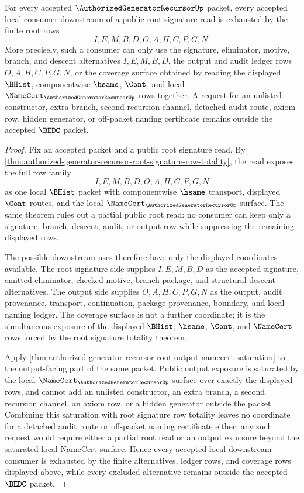 \begin{theorem}
\label{thm:authorized-generator-recursor-root-signature-downstream-coverage}
For every accepted $\AuthorizedGeneratorRecursorUp$ packet, every accepted local consumer downstream of a public root signature read is exhausted by the finite root rows
$$
I,E,M,B,D,O,A,H,C,P,G,N.
$$
More precisely, such a consumer can only use the signature, eliminator, motive, branch, and descent alternatives $I,E,M,B,D$, the output and audit ledger rows $O,A,H,C,P,G,N$, or the coverage surface obtained by reading the displayed $\BHist$, componentwise $\hsame$, $\Cont$, and local $\NameCert_{\AuthorizedGeneratorRecursorUp}$ rows together. A request for an unlisted constructor, extra branch, second recursion channel, detached audit route, axiom row, hidden generator, or off-packet naming certificate remains outside the accepted $\BEDC$ packet.
\end{theorem}
\begin{proof}
Fix an accepted packet and a public root signature read. By \autoref{thm:authorized-generator-recursor-root-signature-row-totality}, the read exposes the full row family
$$
I,E,M,B,D,O,A,H,C,P,G,N
$$
as one local $\BHist$ packet with componentwise $\hsame$ transport, displayed $\Cont$ routes, and the local $\NameCert_{\AuthorizedGeneratorRecursorUp}$ surface. The same theorem rules out a partial public root read: no consumer can keep only a signature, branch, descent, audit, or output row while suppressing the remaining displayed rows.

The possible downstream uses therefore have only the displayed coordinates available. The root signature side supplies $I,E,M,B,D$ as the accepted signature, emitted eliminator, checked motive, branch package, and structural-descent alternatives. The output side supplies $O,A,H,C,P,G,N$ as the output, audit provenance, transport, continuation, package provenance, boundary, and local naming ledger. The coverage surface is not a further coordinate; it is the simultaneous exposure of the displayed $\BHist$, $\hsame$, $\Cont$, and $\NameCert$ rows forced by the root signature totality theorem.

Apply \autoref{thm:authorized-generator-recursor-root-output-namecert-saturation} to the output-facing part of the same packet. Public output exposure is saturated by the local $\NameCert_{\AuthorizedGeneratorRecursorUp}$ surface over exactly the displayed rows, and cannot add an unlisted constructor, an extra branch, a second recursion channel, an axiom row, or a hidden generator outside the packet. Combining this saturation with root signature row totality leaves no coordinate for a detached audit route or off-packet naming certificate either: any such request would require either a partial root read or an output exposure beyond the saturated local NameCert surface. Hence every accepted local downstream consumer is exhausted by the finite alternatives, ledger rows, and coverage rows displayed above, while every excluded alternative remains outside the accepted $\BEDC$ packet.
\end{proof}

